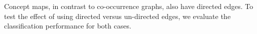 Concept maps, in contrast to co-occurrence graphs, also have directed edges.
To test the effect of using directed versus un-directed edges, we evaluate the classification performance for both cases.